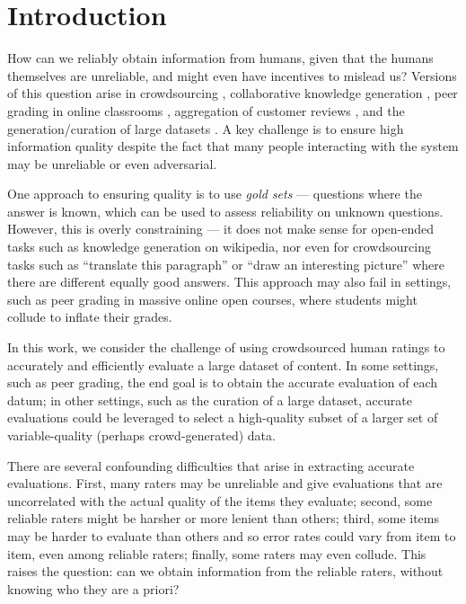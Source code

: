 \section{Introduction}
\label{sec:intro}


How can we reliably obtain information from humans, given that the humans 
themselves are unreliable, and might even have incentives to mislead us?
Versions of this question arise in crowdsourcing \citep{vuurens2011spam}, 
collaborative knowledge generation \citep{priedhorsky2007creating}, peer grading 
in online classrooms \citep{piech2013tuned,kulkarni2015peer},  aggregation 
of customer reviews \citep{harmon2004amazon}, and the generation/curation of large datasets \citep{deng2009imagenet}. A key challenge is to ensure 
high information quality despite the fact that many people interacting with 
the system may be unreliable or even adversarial.

One approach to ensuring quality is to use \emph{gold sets} --- questions where 
the answer is known, which can be used to assess reliability on unknown questions. 
However, this is overly constraining --- it does not make sense for open-ended 
tasks such as knowledge generation on wikipedia, nor even for crowdsourcing 
tasks such as ``translate this paragraph'' or ``draw an interesting picture'' 
where there are different equally good answers.   This approach may also fail 
in settings, such as %
peer grading in massive online open courses, where 
students might collude to inflate their grades.

In this work, we consider the challenge of using crowdsourced human ratings to accurately and efficiently evaluate a large dataset of content.   In some settings, such as peer grading, the end goal is to obtain the accurate evaluation of each datum; in other settings, such as the curation of a large dataset, accurate evaluations could be leveraged to select a high-quality subset of a larger set of variable-quality (perhaps crowd-generated) data.  

There are several confounding difficulties that arise in extracting accurate evaluations.  First, many raters may be unreliable and give evaluations that are uncorrelated with the actual quality of the items they evaluate; 
second, some reliable raters might be harsher or more lenient than others; 
third, some items may be harder to evaluate than others 
and so error rates could vary from item to item, even among reliable raters; 
finally, some raters may even collude. %
This raises the question: can we obtain 
information from the reliable raters, without knowing who they are a priori?


